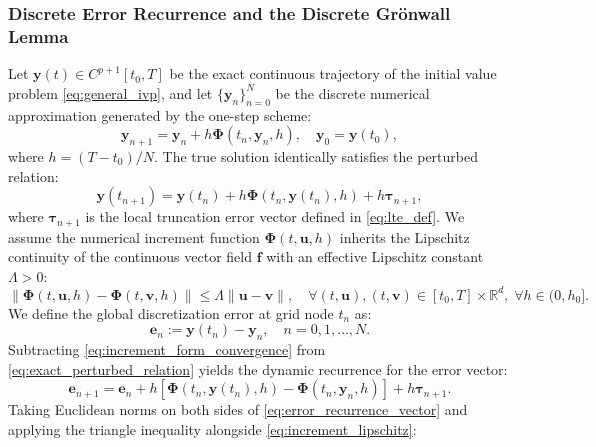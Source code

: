 \documentclass[11pt,a4paper]{article}
\theoremstyle{definition}
\theoremstyle{remark}
\begin{document}
\subsubsection{Discrete Error Recurrence and the Discrete Gr\"onwall Lemma}
Let $\mathbf{y}(t) \in C^{p+1}[t_0, T]$ be the exact continuous trajectory of the initial value problem \eqref{eq:general_ivp}, and let $\{\mathbf{y}_n\}_{n=0}^N$ be the discrete numerical approximation generated by the one-step scheme:
\begin{equation}
\label{eq:increment_form_convergence}
\mathbf{y}_{n+1} = \mathbf{y}_n + h \mathbf{\Phi}(t_n, \mathbf{y}_n, h), \quad \mathbf{y}_0 = \mathbf{y}(t_0),
\end{equation}
where $h = (T - t_0)/N$. The true solution identically satisfies the perturbed relation:
\begin{equation}
\label{eq:exact_perturbed_relation}
\mathbf{y}(t_{n+1}) = \mathbf{y}(t_n) + h \mathbf{\Phi}(t_n, \mathbf{y}(t_n), h) + h \boldsymbol{\tau}_{n+1},
\end{equation}
where $\boldsymbol{\tau}_{n+1}$ is the local truncation error vector defined in \eqref{eq:lte_def}. We assume the numerical increment function $\mathbf{\Phi}(t, \mathbf{u}, h)$ inherits the Lipschitz continuity of the continuous vector field $\mathbf{f}$ with an effective Lipschitz constant $\Lambda > 0$:
\begin{equation}
\label{eq:increment_lipschitz}
\|\mathbf{\Phi}(t, \mathbf{u}, h) - \mathbf{\Phi}(t, \mathbf{v}, h)\| \le \Lambda \|\mathbf{u} - \mathbf{v}\|, \quad \forall (t, \mathbf{u}), (t, \mathbf{v}) \in [t_0, T] \times \mathbb{R}^d, \; \forall h \in (0, h_0].
\end{equation}
We define the global discretization error at grid node $t_n$ as:
\begin{equation}
\label{eq:global_error_def}
\mathbf{e}_n := \mathbf{y}(t_n) - \mathbf{y}_n, \quad n = 0, 1, \dots, N.
\end{equation}
Subtracting \eqref{eq:increment_form_convergence} from \eqref{eq:exact_perturbed_relation} yields the dynamic recurrence for the error vector:
\begin{equation}
\label{eq:error_recurrence_vector}
\mathbf{e}_{n+1} = \mathbf{e}_n + h \left[ \mathbf{\Phi}(t_n, \mathbf{y}(t_n), h) - \mathbf{\Phi}(t_n, \mathbf{y}_n, h) \right] + h \boldsymbol{\tau}_{n+1}.
\end{equation}
Taking Euclidean norms on both sides of \eqref{eq:error_recurrence_vector} and applying the triangle inequality alongside \eqref{eq:increment_lipschitz}:
\end{document}
